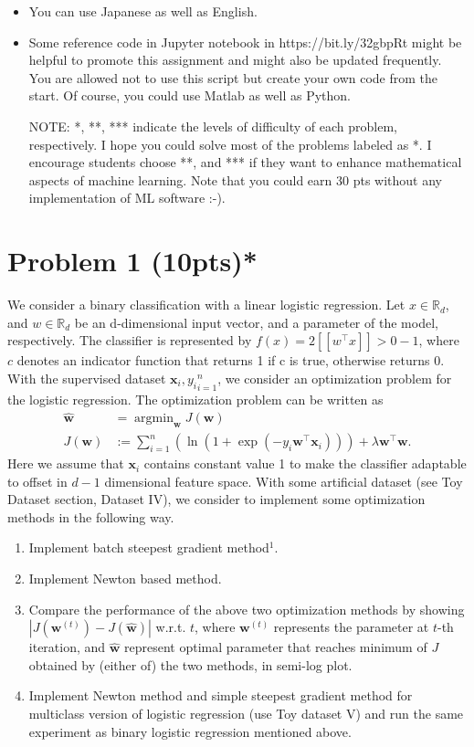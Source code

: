 \documentclass{jsarticle}
\DeclareMathOperator*{\argmin}{argmin}
\begin{document}
\begin{itemize}
  \item You can use Japanese as well as English.
  \item Some reference code in Jupyter notebook in https://bit.ly/32gbpRt might be helpful to promote this assignment and might also be updated frequently. You are allowed not to use this script but create your own code from the start. Of course, you could use Matlab as well as Python.

NOTE: *, **, *** indicate the levels of difficulty of each problem, respectively. I hope you could solve most of the problems labeled as *. I encourage students choose **, and *** if they want to enhance mathematical aspects of machine learning. Note that you could earn 30 pts without any implementation of ML software :-).
\end{itemize}

\section*{Problem 1 (10pts)*}
We consider a binary classification with a linear logistic regression. Let $x \in \mathbb R_d$, and $w \in \mathbb R_d$ be an d-dimensional input vector, and a parameter of the model, respectively. The classifier is represented by $f(x) = 2 [\![w^\top x]\!] > 0 - 1$, where $c$ denotes an indicator function that returns 1 if c is true, otherwise returns 0. With the supervised dataset ${\bm x_i, y_i}^n_{i=1}$, we consider an optimization problem for the logistic regression. The optimization problem can be written as
\begin{align*}
  \hat{\bm w} &=  \argmin_{\bm w} J(\bm w) \\
  J(\bm w) &:= \sum_{i=1}^n (\ln (1+\exp(-y_i\bm w^\top \bm x_i))) + \lambda\bm w^\top\bm w.
\end{align*}
Here we assume that $\bm x_i$ contains constant value 1 to make the classifier adaptable to offset in $d − 1$ dimensional feature space. With some artificial dataset (see Toy Dataset section, Dataset IV), we consider to implement some optimization methods in the following way.

\begin{enumerate}
  \item Implement batch steepest gradient method$^1$.
  \item Implement Newton based method.
  \item Compare the performance of the above two optimization methods by showing $|J(\bm w^{(t)}) − J(\hat{\bm w})|$ w.r.t. $t$, where $\bm w^{(t)}$ represents the parameter at $t$-th iteration, and $\hat{\bm w}$ represent optimal parameter that reaches minimum of $J$ obtained by (either of) the two methods, in semi-log plot.
  \item Implement Newton method and simple steepest gradient method for multiclass version of logistic regression (use Toy dataset V) and run the same experiment as binary logistic regression mentioned above.
\end{enumerate}
\end{document}
